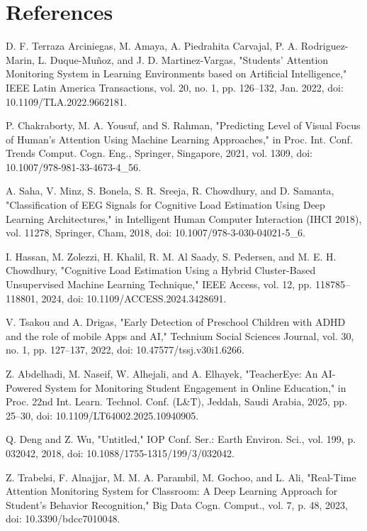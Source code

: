 \documentclass[12pt]{article}
\begin{document}
\section{References}
\vspace{-2em}
\renewcommand{\refname}{} %
\begin{thebibliography}{99}

 D. F. Terraza Arciniegas, M. Amaya, A. Piedrahita Carvajal, P. A. Rodriguez-Marin, L. Duque-Muñoz, and J. D. Martinez-Vargas, "Students' Attention Monitoring System in Learning Environments based on Artificial Intelligence," IEEE Latin America Transactions, vol. 20, no. 1, pp. 126–132, Jan. 2022, doi: 10.1109/TLA.2022.9662181.

 P. Chakraborty, M. A. Yousuf, and S. Rahman, "Predicting Level of Visual Focus of Human’s Attention Using Machine Learning Approaches," in Proc. Int. Conf. Trends Comput. Cogn. Eng., Springer, Singapore, 2021, vol. 1309, doi: 10.1007/978-981-33-4673-4\_56.

 A. Saha, V. Minz, S. Bonela, S. R. Sreeja, R. Chowdhury, and D. Samanta, "Classification of EEG Signals for Cognitive Load Estimation Using Deep Learning Architectures," in Intelligent Human Computer Interaction (IHCI 2018), vol. 11278, Springer, Cham, 2018, doi: 10.1007/978-3-030-04021-5\_6.

 I. Hassan, M. Zolezzi, H. Khalil, R. M. Al Saady, S. Pedersen, and M. E. H. Chowdhury, "Cognitive Load Estimation Using a Hybrid Cluster-Based Unsupervised Machine Learning Technique," IEEE Access, vol. 12, pp. 118785–118801, 2024, doi: 10.1109/ACCESS.2024.3428691.

 V. Tsakou and A. Drigas, "Early Detection of Preschool Children with ADHD and the role of mobile Apps and AI," Technium Social Sciences Journal, vol. 30, no. 1, pp. 127–137, 2022, doi: 10.47577/tssj.v30i1.6266.

 Z. Abdelhadi, M. Naseif, W. Alhejali, and A. Elhayek, "TeacherEye: An AI-Powered System for Monitoring Student Engagement in Online Education," in Proc. 22nd Int. Learn. Technol. Conf. (L&T), Jeddah, Saudi Arabia, 2025, pp. 25–30, doi: 10.1109/LT64002.2025.10940905.

 Q. Deng and Z. Wu, "Untitled," IOP Conf. Ser.: Earth Environ. Sci., vol. 199, p. 032042, 2018, doi: 10.1088/1755-1315/199/3/032042.

 Z. Trabelsi, F. Alnajjar, M. M. A. Parambil, M. Gochoo, and L. Ali, "Real-Time Attention Monitoring System for Classroom: A Deep Learning Approach for Student’s Behavior Recognition," Big Data Cogn. Comput., vol. 7, p. 48, 2023, doi: 10.3390/bdcc7010048.


\end{thebibliography}
\end{document}
